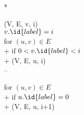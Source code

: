 \begin{pseudo}*

    (V, E, v, i)              \\

    $v.\id{label} = i$                     \\

    for $(u,v)\in E$                       \\+
        if $0 < v.\id{label} < i$          \\+
            (V, E, u, i)      \\--

    for $(u,v)\in E$                       \\+
        if $u.\id{label} = 0$              \\+
            (V, E, u, i+1)

\end{pseudo}
